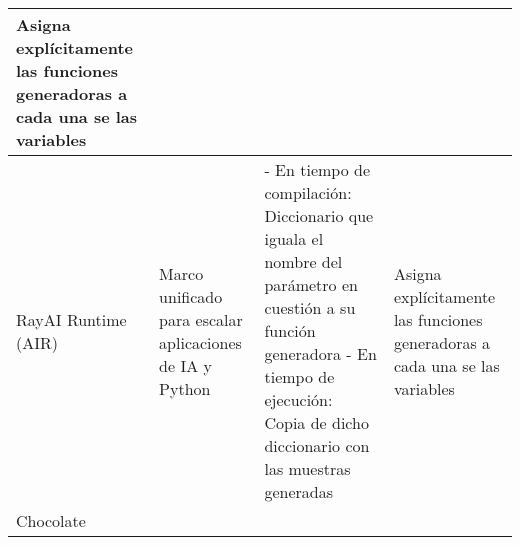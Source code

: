 \begin{longtable}{  p{2.5cm}  p{4cm}  p{6.8cm}  p{6.5cm} }
    Asigna explícitamente las funciones generadoras a cada una se las variables                                                                                                                                                                                                                                                                                     \\
    \hline
    \rowcolor{lavender}
    RayAI Runtime (AIR)                                                                                                                                                                                                                                                                                                                                           &
    Marco unificado para escalar aplicaciones de IA y Python                                                                                                                                                                                                                                                                                                      &
    - En tiempo de compilación: Diccionario que iguala el nombre del parámetro en cuestión a su función generadora \newline- En tiempo de ejecución: Copia de dicho diccionario con las muestras generadas                                                                                                                                                        &
    Asigna explícitamente las funciones generadoras a cada una se las variables                                                                                                                                                                                                                                                                                     \\
    \hline
    Chocolate                                                                                                                                                                                                                                                                                                                                                     &

\end{longtable}
